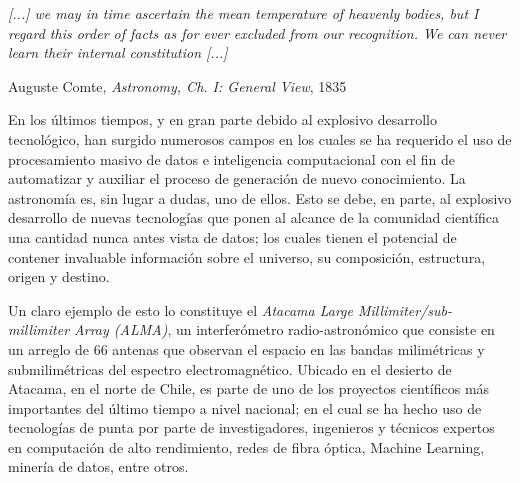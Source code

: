 \begin{intro}





\vspace{1em}
\hfill{}
\begin{minipage}{9cm}{
\begin{spacing}{0.9}
\small
\noindent
\textit{[...] we may in time ascertain the mean temperature of heavenly bodies, but I regard this order of facts as for ever excluded from our recognition. We can never learn their internal constitution [...]}
\end{spacing}
\vspace{1em}
\hfill{}{Auguste Comte, \textit{Astronomy, Ch. I: General View}, 1835}
}
\vspace{2em}
\end{minipage}

En los últimos tiempos, y en gran parte debido al explosivo desarrollo tecnológico, han surgido numerosos campos en los cuales se ha requerido el uso de procesamiento masivo de datos e inteligencia computacional con el fin de automatizar y auxiliar el proceso de generación de nuevo conocimiento. La astronomía es, sin lugar a dudas, uno de ellos. Esto se debe, en parte, al explosivo desarrollo de nuevas tecnologías que ponen al alcance de la comunidad científica una cantidad nunca antes vista de datos; los cuales tienen el potencial de contener invaluable información sobre el universo, su composición, estructura, origen y destino.

Un claro ejemplo de esto lo constituye el \textit{Atacama Large Millimiter/sub-millimiter Array (ALMA)}, un interferómetro radio-astronómico que consiste en un arreglo de 66 antenas que observan el espacio en las bandas milimétricas y submilimétricas del espectro electromagnético. Ubicado en el desierto de Atacama, en el norte de Chile, es parte de uno de los proyectos científicos más importantes del último tiempo a nivel nacional; en el cual se ha hecho uso de tecnologías de punta por parte de investigadores, ingenieros y técnicos expertos en computación de alto rendimiento, redes de fibra óptica, Machine Learning, minería de datos, entre otros. 


\end{intro}
